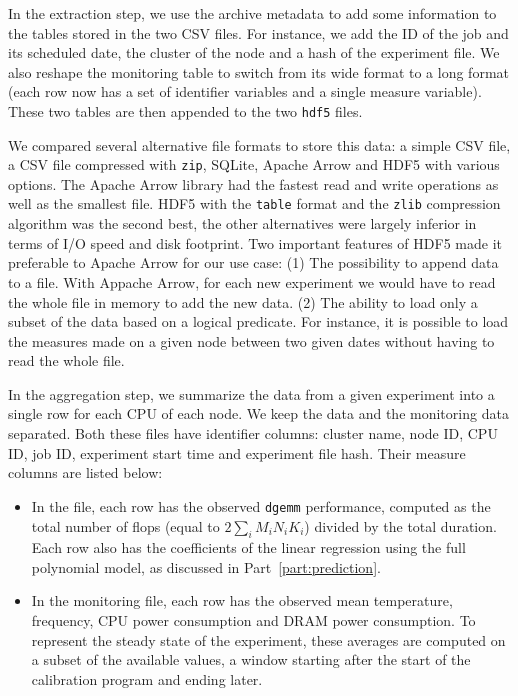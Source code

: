                 In the extraction step, we use the archive metadata to add some information to the tables stored in the
                two CSV files. For instance, we add the ID of the job and its scheduled date, the cluster of the node
                and a hash of the experiment file. We also reshape the monitoring table to switch from its wide format
                to a long format (\ie each row now has a set of identifier variables and a single measure variable).
                These two tables are then appended to the two \texttt{hdf5} files.

                We compared several alternative file formats to store this data: a simple CSV file, a CSV file
                compressed with \texttt{zip}, SQLite\cite{sqlite}, Apache Arrow \cite{arrow} and HDF5\cite{hdf5} with
                various options. The Apache Arrow library had the fastest read and write operations as well as the
                smallest file. HDF5 with the \texttt{table} format and the \texttt{zlib} compression algorithm was the
                second best, the other alternatives were largely inferior in terms of I/O speed and disk footprint. Two
                important features of HDF5 made it preferable to Apache Arrow for our use case:
                (1) The possibility to append data to a file. With Appache Arrow, for each new experiment we would have
                to read the whole file in memory to add the new data.  (2) The ability to load only a subset of the data
                based on a logical predicate. For instance, it is possible to load the measures made on a given node
                between two given dates without having to read the whole file.

                In the aggregation step, we summarize the data from a given experiment into a single row for each CPU of
                each node. We keep the \dgemm data and the monitoring data separated. Both these files have identifier
                columns: cluster name, node ID, CPU ID, job ID, experiment start time and experiment file hash. Their
                measure columns are listed below:
                \begin{itemize}
                    \item In the \dgemm file, each row has the observed \texttt{dgemm} performance, computed as the
                        total number of flops (equal to \(2\sum_i M_iN_iK_i\)) divided by the total duration. Each row
                        also has the coefficients of the linear regression using the full polynomial model, as discussed
                        in Part~\ref{part:prediction}.
                    \item In the monitoring file, each row has the observed mean temperature, frequency, CPU power
                        consumption and DRAM power consumption. To represent the steady state of the experiment, these
                        averages are computed on a subset of the available values, a window starting 
                        after the start of the \dgemm calibration program and ending  later.
                \end{itemize}

